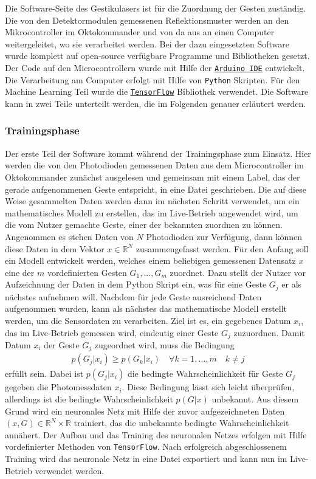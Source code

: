 Die Software-Seite des Gestikulasers ist für die Zuordnung der Gesten zuständig. Die von den Detektormodulen gemessenen Reflektionsmuster werden an den Mikrocontroller im Oktokommander und von da aus an einen Computer weitergeleitet, wo sie verarbeitet werden. Bei der dazu eingesetzten Software wurde komplett auf open-source verfügbare Programme und Bibliotheken gesetzt. Der Code auf den Microcontrollern wurde mit Hilfe der \href{https://www.arduino.cc/en/Main/Software}{\texttt{Arduino IDE}} entwickelt. Die Verarbeitung am Computer erfolgt mit Hilfe von \texttt{Python} Skripten. Für den Machine Learning Teil wurde die \href{https://www.tensorflow.org/}{\texttt{TensorFlow}\texttrademark} Bibliothek verwendet. Die Software kann in zwei Teile unterteilt werden, die im Folgenden genauer erläutert werden.

\subsubsection*{Trainingsphase}
Der erste Teil der Software kommt während der Trainingsphase zum Einsatz. Hier werden die von den Photodioden gemessenen Daten aus dem Microcontroller im Oktokommander zunächst ausgelesen und gemeinsam mit einem Label, das der gerade aufgenommenen Geste entspricht, in eine Datei geschrieben. Die auf diese Weise gesammelten Daten werden dann im nächsten Schritt verwendet, um ein mathematisches Modell zu erstellen, das im Live-Betrieb angewendet wird, um die vom Nutzer gemachte Geste, einer der bekannten zuordnen zu können. Angenommen es stehen Daten von $N$ Photodioden zur Verfügung, dann können diese Daten in dem Vektor $x\in \mathbb{R}^N$ zusammengefasst werden. Für den Anfang soll ein Modell entwickelt werden, welches einem beliebigen gemessenen Datensatz $x$ eine der $m$ vordefinierten Gesten $G_1 , ... , G_m$ zuordnet. Dazu stellt der Nutzer vor Aufzeichnung der Daten in dem Python Skript ein, was für eine Geste $G_j$ er als nächstes aufnehmen will. Nachdem für jede Geste ausreichend Daten aufgenommen wurden, kann als nächstes das mathematische Modell erstellt werden, um die Sensordaten zu verarbeiten. Ziel ist es, ein gegebenes Datum $x_i$, das im Live-Betrieb gemessen wird, eindeutig einer Geste $G_j$ zuzuordnen. Damit Datum $x_i$ der Geste $G_j$ zugeordnet wird, muss die Bedingung 
\begin{align*}
	p(G_j | x_i) \geq p(G_k | x_i) \quad \forall k = 1,...,m \quad k \neq j
\end{align*}
erfüllt sein. Dabei ist $p(G_j | x_i)$ die bedingte Wahrscheinlichkeit für Geste $G_j$ gegeben die Photomessdaten $x_i$. Diese Bedingung lässt sich leicht überprüfen, allerdings ist die bedingte Wahrscheinlichkeit $p(G | x)$ unbekannt. Aus diesem Grund wird ein neuronales Netz mit Hilfe der zuvor aufgezeichneten Daten $(x,G) \in \mathbb{R}^N \times \mathbb{R}$ trainiert, das die unbekannte bedingte Wahrscheinlichkeit annähert. Der Aufbau und das Training des neuronalen Netzes erfolgen mit Hilfe vordefinierter Methoden von \texttt{TensorFlow}\texttrademark. Nach erfolgreich abgeschlossenem Training wird das neuronale Netz in eine Datei exportiert und kann nun im Live-Betrieb verwendet werden.

